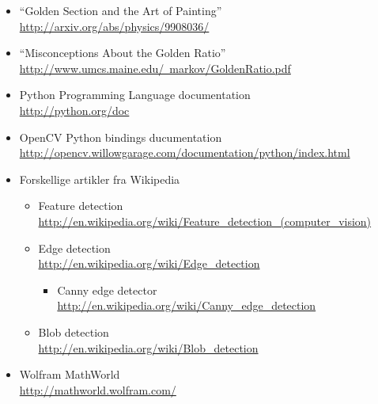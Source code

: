 \begin{itemize}
	\item ``Golden Section and the Art of Painting''\\
		\href{http://arxiv.org/abs/physics/9908036/}{http://arxiv.org/abs/physics/9908036/}
	\item ``Misconceptions About the Golden Ratio''\\
		\href{http://www.umcs.maine.edu/~markov/GoldenRatio.pdf}{http://www.umcs.maine.edu/~markov/GoldenRatio.pdf}
	\item Python Programming Language documentation\\
		\href{http://python.org/doc}{http://python.org/doc}
	\item OpenCV Python bindings ducumentation\\
		\href{http://opencv.willowgarage.com/documentation/python/index.html}{http://opencv.willowgarage.com/documentation/python/index.html}
	\item Forskellige artikler fra Wikipedia\\
		\begin{itemize}
			\item Feature detection\\
				\href{http://en.wikipedia.org/wiki/Feature\_detection\_(computer\_vision)}{http://en.wikipedia.org/wiki/Feature\_detection\_(computer\_vision)}\\
			\item Edge detection\\
				\href{http://en.wikipedia.org/wiki/Edge\_detection}{http://en.wikipedia.org/wiki/Edge\_detection}
					\begin{itemize}
						\item Canny edge detector\\
							\href{http://en.wikipedia.org/wiki/Canny\_edge\_detection}{http://en.wikipedia.org/wiki/Canny\_edge\_detection}
					\end{itemize}
			\item Blob detection\\
				\href{http://en.wikipedia.org/wiki/Blob\_detection}{http://en.wikipedia.org/wiki/Blob\_detection}
		\end{itemize}
	\item Wolfram MathWorld\\
		\href{http://mathworld.wolfram.com/}{http://mathworld.wolfram.com/}
\end{itemize}
